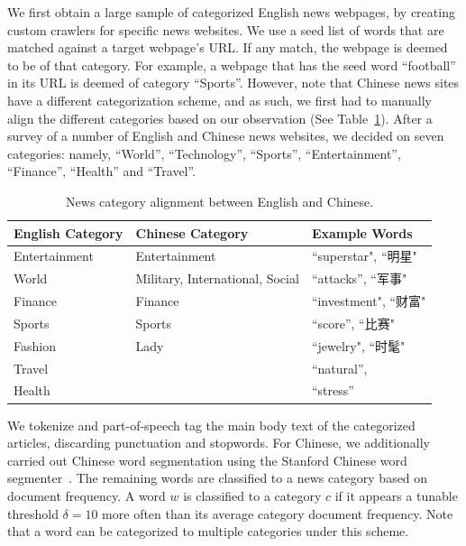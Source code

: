 \begin{CJK}{UTF8}{gbsn}
We first obtain a large sample of categorized English news webpages,
by creating custom crawlers for specific news websites.  We use a seed
list of words that are matched against a target webpage's URL.  If any
match, the webpage is deemed to be of that category.  For example, a
webpage that has the seed word ``football'' in its URL is deemed of
category ``Sports''.  However, note that Chinese news sites have a
different categorization scheme, and as such, we first had to manually
align the different categories based on our observation (See
Table~\ref{table:cat}).  After a survey of a number of English and
Chinese news websites, we decided on seven categories: namely,
``World'', ``Technology'', ``Sports'', ``Entertainment'', ``Finance'',
``Health'' and ``Travel''.
 


\begin{table}[ht]
\centering
  \caption{News category alignment between English and Chinese.}
  \label{table:cat}
  \begin{tabular}{| p{2.2cm} | p{2.2cm} | p{1.8cm} |}
    \hline
    {\bf English \qquad Category} & {\bf Chinese \qquad Category} & {\bf Example Words}\\
    \hline
    Entertainment & Entertainment & ``superstar", ``明星"\\
    \hline
     World &  Military, \qquad International, Social & ``attacks'', ``军事"  \\
    \hline
    Finance & Finance & ``investment", ``财富"\\
    \hline
    Sports & Sports & ``score'', ``比赛" \\
    \hline
    Fashion &  Lady & ``jewelry", ``时髦"\\
    \hline
    Travel  &  & ``natural'', \\
    \hline
   Health &  & ``stress'' \\
    \hline
  \end{tabular}
\end{table}


We tokenize and part-of-speech tag the main body text of the
categorized articles, discarding punctuation and stopwords.  For
Chinese, we additionally carried out Chinese word segmentation using
the Stanford Chinese word segmenter~\cite{Chang2008}. The remaining
words are classified to a news category based on document frequency. A
word $w$ is classified to a category $c$ if it appears a tunable
threshold $\delta=10$ more often than its average category document
frequency.  Note that a word can be categorized to multiple categories
under this scheme.



\end{CJK}
